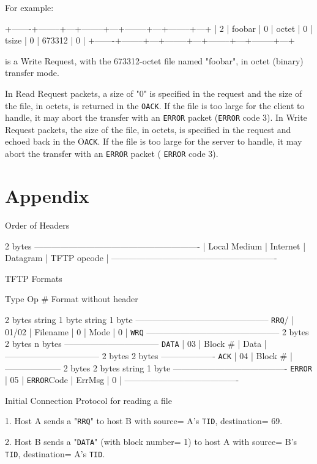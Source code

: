 \documentclass[12pt]{article}
\begin{document}
For example:

   +-------+--------+---+--------+---+--------+---+--------+---+
   |  2  | foobar | 0 | octet | 0 | tsize | 0 | 673312 | 0 |
   +-------+--------+---+--------+---+--------+---+--------+---+

is a Write Request, with the 673312-octet file named "foobar", in octet (binary) transfer mode.

In Read Request packets, a size of "0" is specified in the request and the size of the file, in octets, is returned in the \verb|OACK|. If the file is too large for the client to handle, it may abort the transfer with an  \verb|ERROR| packet (\verb|ERROR| code 3). In Write Request packets, the size of the file, in octets, is specified in the request and echoed back in the O\verb|ACK|. If the file is too large for the server to handle, it may abort the transfer with an \verb|ERROR| packet ( \verb|ERROR| code 3).
  
\section{Appendix}
  Order of Headers
  
                           2 bytes
    ----------------------------------------------------------
   | Local Medium | Internet | Datagram | TFTP opcode |
    ----------------------------------------------------------
  
  TFTP Formats
  
   Type  Op \#   Format without header
  
       2 bytes  string  1 byte   string  1 byte
       -----------------------------------------------
   \verb|RRQ|/ | 01/02 | Filename |  0 |  Mode  |  0 |
   \verb|WRQ|  -----------------------------------------------
       2 bytes  2 bytes    n bytes
       ---------------------------------
   \verb|DATA| | 03  |  Block \# |  Data  |
       ---------------------------------
       2 bytes  2 bytes
       -------------------
   \verb|ACK|  | 04  |  Block \# |
       --------------------
       2 bytes 2 bytes    string  1 byte
       ----------------------------------------
    \verb|ERROR| | 05  |  \verb|ERROR|Code |  ErrMsg  |  0 |
       ----------------------------------------
  
  Initial Connection Protocol for reading a file
  
   1. Host A sends a "\verb|RRQ|" to host B with source= A's \verb|TID|,
     destination= 69.
  
   2. Host B sends a "\verb|DATA|" (with block number= 1) to host A with
     source= B's \verb|TID|, destination= A's \verb|TID|.
  
\end{document}
